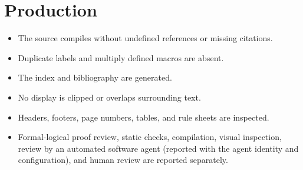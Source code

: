 \documentclass[11pt,oneside,openany]{book}
\theoremstyle{definition}
\theoremstyle{plain}
\theoremstyle{remark}
\begin{document}
\section{Production}
\label{sec:release-checklist-04}
\begin{itemize}
  \item The source compiles without undefined references or missing citations.
  \item Duplicate labels and multiply defined macros are absent.
  \item The index and bibliography are generated.
  \item No display is clipped or overlaps surrounding text.
  \item Headers, footers, page numbers, tables, and rule sheets are inspected.
  \item Formal-logical proof review, static checks, compilation, visual
        inspection, review by an automated software agent (reported with
        the agent identity and configuration), and human review are
        reported separately.
\end{itemize}

\backmatter
\end{document}
